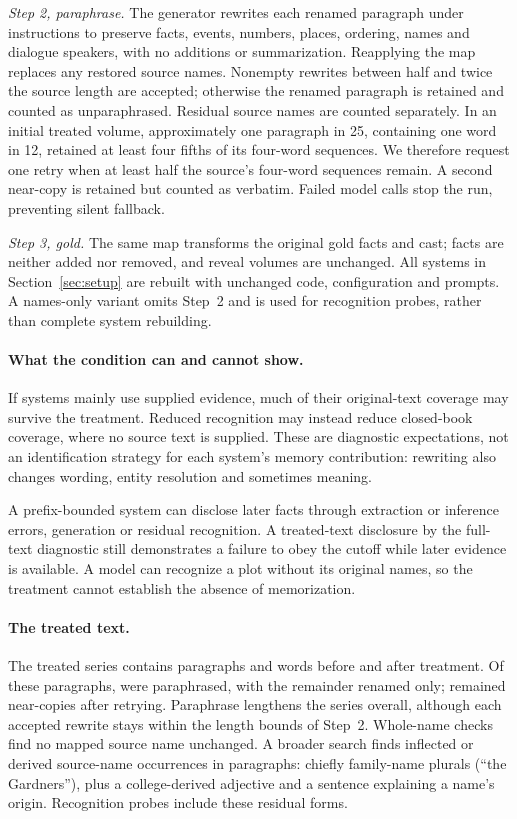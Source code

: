 \emph{Step 2, paraphrase.} The generator rewrites each renamed paragraph under
instructions to preserve facts, events, numbers, places, ordering, names and dialogue
speakers, with no additions or summarization. Reapplying the map replaces any restored
source names. Nonempty rewrites between half and twice the source length are accepted;
otherwise the renamed paragraph is retained and counted as unparaphrased.
Residual source names are counted separately. In an initial treated volume,
approximately one paragraph in 25, containing one word in 12, retained at least four
fifths of its four-word sequences. We therefore request one retry when at least half
the source's four-word sequences remain. A second near-copy is retained but counted
as verbatim. Failed model calls stop the run, preventing silent fallback.

\emph{Step 3, gold.} The same map transforms the original gold facts and cast;
facts are neither added nor removed, and reveal volumes are unchanged.
All systems in Section~\ref{sec:setup} are rebuilt with unchanged code, configuration
and prompts. A names-only variant omits Step~2 and is used for recognition probes,
rather than complete system rebuilding.

\paragraph{What the condition can and cannot show.}
If systems mainly use supplied evidence, much of their original-text coverage may survive
the treatment. Reduced recognition may instead reduce closed-book coverage, where no
source text is supplied. These are diagnostic expectations, not an identification
strategy for each system's memory contribution: rewriting also changes wording,
entity resolution and sometimes meaning.

A prefix-bounded system can disclose later facts through extraction or inference errors,
generation or residual recognition. A treated-text disclosure by the full-text diagnostic
still demonstrates a failure to obey the cutoff while later evidence is available.
A model can recognize a plot without its original names, so the treatment cannot establish
the absence of memorization.

\paragraph{The treated text.}
The treated series contains  paragraphs and
 words before and after treatment. Of these paragraphs,
 were paraphrased, with the remainder renamed only;
 remained near-copies after retrying. Paraphrase lengthens the series
overall, although each accepted rewrite stays within the length bounds of Step~2.
Whole-name checks find no
mapped source name unchanged. A broader search finds
 inflected or derived source-name occurrences in
 paragraphs: chiefly family-name plurals (``the Gardners''),
plus a college-derived adjective and a sentence explaining a name's origin.
Recognition probes include these residual forms.

